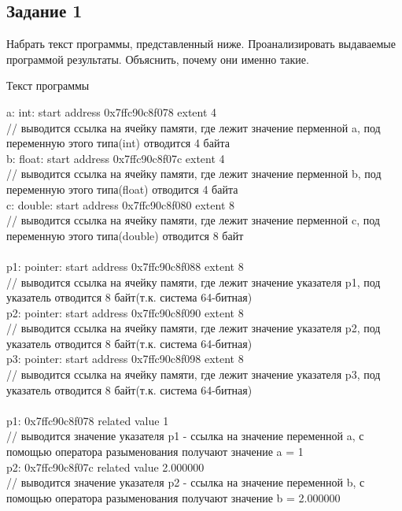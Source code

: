 \documentclass[a4paper,14pt]{extarticle}
\begin{document}
\subsection{Задание 1}
Набрать текст программы, представленный ниже. Проанализировать выдаваемые программой результаты. Объяснить, почему они именно такие.

\begin{center}
Текст программы
\end{center}
a:      int: start address 0x7ffc90c8f078   extent 4 \\
// выводится ссылка на ячейку памяти, где лежит значение перменной a, под переменную этого типа(int) отводится 4 байта\\
b:    float: start address 0x7ffc90c8f07c   extent 4\\
// выводится ссылка на ячейку памяти, где лежит значение перменной b, под переменную этого типа(float) отводится 4 байта\\
c:   double: start address 0x7ffc90c8f080   extent 8\\
// выводится ссылка на ячейку памяти, где лежит значение перменной c, под переменную этого типа(double) отводится 8 байт\\
\\
p1: pointer: start address 0x7ffc90c8f088   extent 8\\
// выводится ссылка на ячейку памяти, где лежит значение указателя p1, под указатель отводится 8 байт(т.к. система 64-битная)\\
p2: pointer: start address 0x7ffc90c8f090   extent 8\\
// выводится ссылка на ячейку памяти, где лежит значение указателя p2, под указатель отводится 8 байт(т.к. система 64-битная)\\
p3: pointer: start address 0x7ffc90c8f098   extent 8\\
// выводится ссылка на ячейку памяти, где лежит значение указателя p3, под указатель отводится 8 байт(т.к. система 64-битная)\\
\\
p1: 0x7ffc90c8f078 related value 1\\
// выводится значение указателя p1 - ссылка на значение переменной a, с помощью оператора разыменования получают значение a = 1\\
p2: 0x7ffc90c8f07c related value 2.000000\\
// выводится значение указателя p2 - ссылка на значение переменной b, с помощью оператора разыменования получают значение b = 2.000000\\
\end{document}
